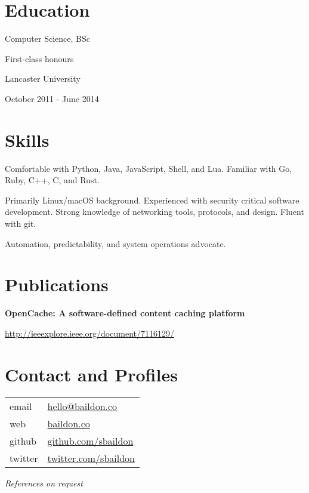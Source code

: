 \documentclass[a4paper,11pt]{article}
\begin{document}
\begin{multicols*}{2}
\vfill\null

\section*{Education}
Computer Science, BSc\par
First-class honours\par
Lancaster University\par
October 2011 - June 2014

\section*{Skills}
Comfortable with Python, Java, JavaScript, Shell, and Lua. Familiar with Go, Ruby, C++, C, and Rust.\medskip

Primarily Linux/macOS background. Experienced with security critical software development. Strong knowledge of networking tools, protocols, and design.  Fluent with git.\medskip

Automation, predictability, and system operations advocate.

\section*{Publications}
\textbf{OpenCache: A software-defined content caching platform}\par
\url{http://ieeexplore.ieee.org/document/7116129/}

\section*{Contact and Profiles}
\noindent \begin{tabular}{@{}ll}
email & \href{mailto:hello@baildon.co}{hello@baildon.co} \\
web & \href{https://baildon.co}{baildon.co} \\
github & \href{https://github.com/sbaildon}{github.com/sbaildon} \\
twitter & \href{https://twitter.com/sbaildon}{twitter.com/sbaildon}
\end{tabular}

\vspace{4ex}
\textit{References on request}

\end{multicols*}
\end{document}
